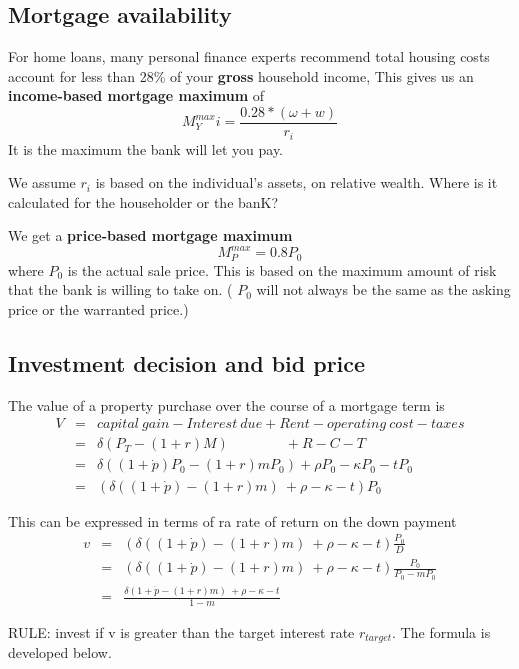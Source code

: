 \subsection{Mortgage availability}

For home loans, many personal finance experts recommend total housing costs account for less than 28\% of your \textbf{gross} household income, This gives us an \textbf{income-based  mortgage maximum} of \[M^{max}_Yi = \frac{0.28*(\omega+w)}{r_i}\] It is the maximum the bank will let you pay.

We assume $r_i$ is based on the individual's assets, on relative wealth. Where is it calculated for the householder or the banK?

We get a \textbf{price-based mortgage maximum} \[M^{max}_P = 0.8P_0\] where $P_0$ is the actual sale price. This is based on the maximum amount of risk that the bank is willing to take on. ( $P_0$  will not always be the same as the asking price or the warranted price.) 

\subsection{Investment decision and bid price}
The value of a property purchase over the course of a mortgage term is
\begin{eqnarray}
V  	&=& capital\ gain - Interest\ due  	+ Rent  - operating\ cost -taxes\\
&=& \delta(P_T- (1+r)M) \qquad \qquad 	 + R  	-C   - T\label{B2}\\
&=& \delta((1+\dot p)  P_0- (1+r)mP_0)   + \rho P_0  	-\kappa P_0 - tP_0\\
&=&( \delta((1+\dot p)  - (1+r)m) \ + \rho   	-\kappa -t) P_0
\end{eqnarray}

This can be expressed in terms of ra rate of return on the down payment
\begin{eqnarray}
v&=&( \delta((1+\dot p)  - (1+r)m) \ + \rho   	-\kappa - t ) \frac{P_0}{D}   \nonumber\\
		&=&( \delta((1+\dot p)  - (1+r)m) \ + \rho   	-\kappa - t ) \frac{P_0}{P_0-mP_0}   \nonumber\\
		&=&\frac{ \delta(1+\dot p  - (1+r)m) \ + \rho   	-\kappa - t } {1-m} \label{Eqn:DecisionRule}
\end{eqnarray}

RULE: invest if v is greater than  the  target interest rate $r_{target}$. The formula is developed below.


